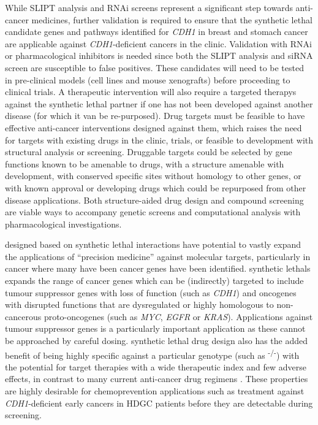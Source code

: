 While \gls{SLIPT} analysis and \gls{RNAi} screens represent a significant step towards anti-cancer medicines, further validation is required to ensure that the \gls{synthetic lethal} candidate genes and pathways identified for \textit{CDH1} in breast and stomach cancer are applicable against \textit{CDH1}-deficient cancers in the clinic.  Validation with \gls{RNAi} or pharmacological inhibitors is needed since both the \gls{SLIPT} analysis and \gls{siRNA} screen are susceptible to false positives. These candidates will need to be tested in pre-clinical models (cell lines and mouse xenografts) before proceeding to clinical trials. A therapeutic intervention will also require a \glspl{targeted therapy} against the \gls{synthetic lethal} partner if one has not been developed against another disease (for which it van be re-purposed). Drug targets must be feasible to have effective anti-cancer interventions designed against them, which raises the need for targets with existing drugs in the clinic, trials, or feasible to development with structural analysis or screening.  Druggable targets could be selected by gene functions known to be amenable to drugs, with a structure amenable with development, with conserved specific sites without homology to other genes, or with known approval or developing drugs which could be repurposed from other disease applications. Both structure-aided drug design and compound screening are viable ways to accompany genetic screens and computational analysis with pharmacological investigations.

 designed based on \gls{synthetic lethal} interactions have potential to vastly expand the applications of ``precision medicine'' against molecular targets, particularly in cancer where many have been cancer genes have been identified. \Glspl{synthetic lethal} expands the range of cancer genes which can be (indirectly) targeted to include \gls{tumour suppressor} genes with loss of function (such as \textit{CDH1}) and \glspl{oncogene} with disrupted functions that are dysregulated or highly homologous to non-cancerous \glspl{proto-oncogene} (such as \textit{MYC}, \textit{EGFR} or \textit{KRAS}). Applications against \gls{tumour suppressor} genes is a particularly important application as these cannot be approached by careful dosing. \Gls{synthetic lethal} drug design also has the added benefit of being highly specific against a particular genotype (such as \textsuperscript{-/-}) with the potential for target therapies with a wide therapeutic index and few adverse effects, in contrast to many current anti-cancer drug regimens \citep{Hopkins2008, Kaelin2009}. These properties are highly desirable for \gls{chemoprevention} applications such as \gls{treatment} against \textit{CDH1}-deficient early cancers in \gls{HDGC} patients \citep{Guilford2010} before they are detectable during screening.


